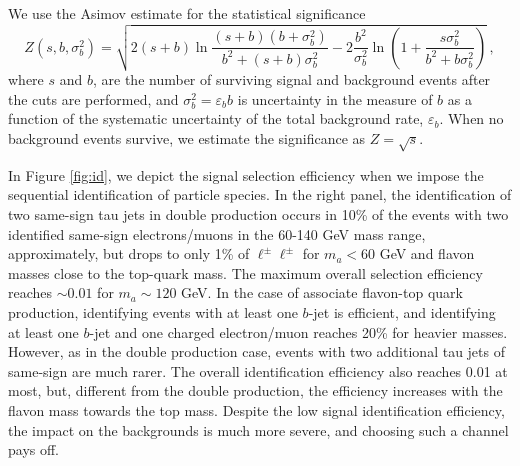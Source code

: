\documentclass[prd,amsfonts,onecolumn,superscriptaddress,aps,nofootinbib,11pt]{revtex4-1}
\begin{document}
We use the Asimov estimate for the statistical significance~\cite{Cowan_2011}
\begin{equation}
    Z(s, b, \sigma_b^2) = \sqrt{2 (s+b)\ln \frac{(s+b)(b+\sigma_b^2)}{b^2 + (s+b)\sigma_b^2} - 2 \frac{b^2}{\sigma_b^2} \ln \left(1 +\frac{s \sigma_b^2}{b^2 + b \sigma_b^2}\right)} \,,
\end{equation}
where $s$ and $b$, are the number of surviving signal and background events after the cuts are performed, and $\sigma_b^2 = \varepsilon_b b$ is uncertainty in the measure of $b$ as a function of the systematic uncertainty of the total background rate, $\varepsilon_b$. When no background events survive, we estimate the significance as $Z=\sqrt{s}$.

In Figure \ref{fig:id}, we depict the signal selection efficiency when we impose the sequential identification  of particle species. In the right panel, the identification of two same-sign tau jets in double production occurs in 10\% of the events with two identified same-sign electrons/muons in the 60-140 GeV mass range, approximately, but drops to only 1\% of $\ell^\pm\ell^\pm$ for $m_a<60$ GeV and flavon masses close to the top-quark mass. The maximum overall selection efficiency reaches $\sim 0.01$ for $m_a\sim 120$ GeV. In the case of associate flavon-top quark production, identifying events with at least one $b$-jet is efficient, and identifying at least one $b$-jet and one charged electron/muon reaches 20\% for heavier masses. However, as in the double production case, events with two additional tau jets of same-sign are much rarer. The overall identification efficiency also reaches 0.01 at most, but, different from the double production, the efficiency increases with the flavon mass towards the top mass. Despite the low signal identification efficiency, the impact on the backgrounds is much more severe, and choosing such a channel pays off.
\end{document}
